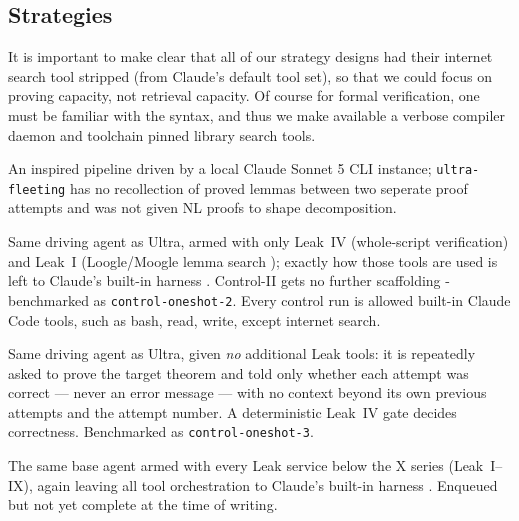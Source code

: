 \documentclass[12pt, a4paper]{article}
\newcommand{\run}[1]{\texttt{#1}}
\begin{document}
\subsection{Strategies}
\label{sec:strategies}

\begin{description}[itemsep=2pt]

  \item It is important to make clear that all of our strategy designs had their internet search tool stripped (from Claude's default tool set), so that
      we could focus on proving capacity, not retrieval capacity. Of course for formal verification, one must be familiar
      with the syntax, and thus we make available a verbose compiler daemon and toolchain pinned library search tools.
  \item[Ultra (Lifted Goedel Architect).] An inspired pipeline driven by a local
        Claude Sonnet 5 CLI \cite{anthropic2026sonnet5} instance; \run{ultra-fleeting} has no recollection
        of proved lemmas between two seperate proof attempts and was not given NL proofs to shape decomposition.
  \item[Control~II (compiler + lemma search).] Same driving agent as Ultra, armed with only Leak~IV (whole-script
        verification) and Leak~I (Loogle/Moogle lemma search
        \cite{loogle,moogle}); exactly how those tools are used is left to
        Claude's built-in harness \cite{anthropicharness}. Control-II gets no further scaffolding - benchmarked as
        \run{control-oneshot-2}. Every control run is allowed built-in Claude Code tools, such as bash, read, write, except internet search.
  \item[Control~III (blind prover).] Same driving agent as Ultra, given \emph{no} additional Leak tools:
        it is repeatedly asked to prove the target theorem and told only whether
        each attempt was correct --- never an error message --- with no context
        beyond its own previous attempts and the attempt number. A deterministic
        Leak~IV gate decides correctness. Benchmarked as \run{control-oneshot-3}.
  \item[Control~IV (compiler + pantograph + lemma search).] The same base agent armed with
        every Leak service below the X series (Leak~I--IX), again leaving all
        tool orchestration to Claude's built-in harness \cite{anthropicharness}.
        Enqueued but not yet complete at the time of writing.
\end{description}
\end{document}
